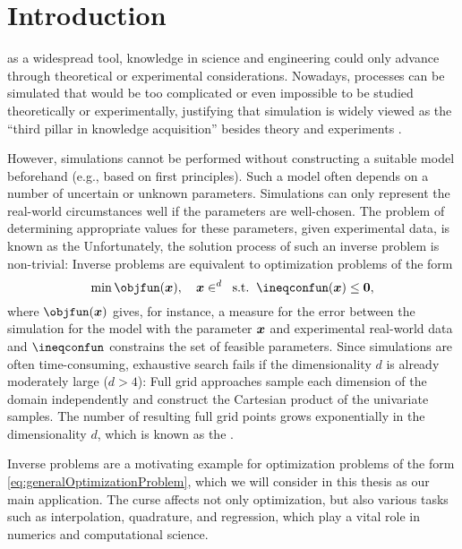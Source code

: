 
\chapter{Introduction}
\label{chap:10introduction}

as a widespread tool,
knowledge in science and engineering could only advance through
theoretical or experimental considerations.
Nowadays, processes can be simulated
that would be too complicated or even impossible
to be studied theoretically or experimentally,
justifying that simulation is widely viewed as the
``third pillar in knowledge acquisition''
besides theory and experiments \cite{Bungartz14Modeling}.

However, simulations cannot be performed without constructing
a suitable model beforehand (e.g., based on first principles).
Such a model often depends on a number of uncertain or unknown parameters.
Simulations can only represent the real-world circumstances well
if the parameters are well-chosen.
The problem of determining appropriate values for these parameters,
given experimental data, is known as the 
Unfortunately, the solution process of such an inverse problem is non-trivial:
Inverse problems are equivalent to optimization problems of the form
\begin{equation}
  \label{eq:generalOptimizationProblem}
  \min \objfun(\*x),\quad
  \*x \in \real^d\;\;\text{s.t.}\;\;
  \ineqconfun(\*x) \le \*0,
\end{equation}
where $\objfun(\*x)$ gives, for instance,
a measure for the error between the simulation for the model with
the parameter ${\boldsymbol{x}}$ and experimental real-world data and
$\ineqconfun$ constrains the set of feasible parameters.
Since simulations are often time-consuming,
exhaustive search fails
if the dimensionality $d$ is already moderately large ($d > 4$):
Full grid approaches sample each dimension of the domain
independently and construct the Cartesian product of the univariate
samples.
The number of resulting full grid points
grows exponentially in the dimensionality $d$,
which is known as the  \cite{Bellman61Adaptive}.

Inverse problems are a motivating example for optimization problems
of the form \eqref{eq:generalOptimizationProblem}, which we will consider in
this thesis as our main application.
The curse affects not only optimization,
but also various tasks such as interpolation, quadrature, and regression,
which play a vital role in numerics and computational science.

